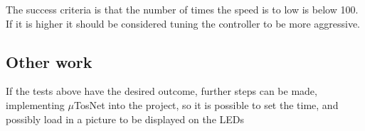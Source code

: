 The success criteria is that the number of times the speed is to low is below 100.
If it is higher it should be considered tuning the controller to be more aggressive.

\subsection{Other work}
If the tests above have the desired outcome, further steps can be made, implementing $\mu$TosNet into the project, so it is possible to set the time, and possibly load in a picture to be displayed on the LEDs